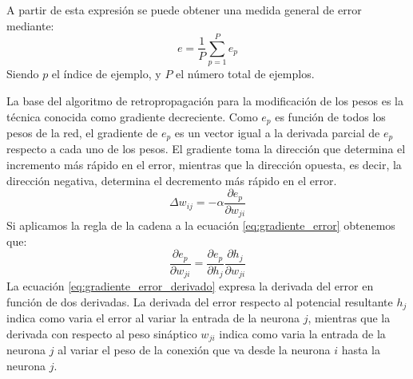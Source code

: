 \documentclass[12pt,letterpaper,oneside,openright]{book}
\begin{document}
 	A partir de esta expresión se puede obtener una medida general de error mediante: 
 	\begin{equation}
 		\label{eq:error_general}
 		e = \frac{1}{P} \sum_{p=1}^{P}e_p
 	\end{equation}
 	Siendo $p$ el índice de ejemplo, y $P$ el número total de ejemplos.
 	
 	La base del algoritmo de retropropagación para la modificación de los pesos es la técnica conocida como gradiente decreciente.
 	Como $e_p$ es función de todos los pesos de la red, el gradiente de $e_p$ es un vector igual a la derivada parcial de $e_p$ respecto a cada uno de los pesos. El gradiente toma la dirección que determina el incremento más rápido en el error, mientras que la dirección opuesta, es decir, la dirección negativa, determina el decremento más rápido en el error.
 	\begin{equation}
 		\label{eq:gradiente_error}
 		\Delta w_{ij} = -\alpha\frac{\partial e_p}{\partial w_{ji}}
 	\end{equation}
 	Si aplicamos la regla de la cadena a la ecuación \ref{eq:gradiente_error} obtenemos que:
 	\begin{equation}
 		\label{eq:gradiente_error_derivado}
 		\frac{\partial e_p}{\partial w_{ji}} = \frac{\partial e_p}{\partial h_j}\frac{\partial h_j}{\partial w_{ji}}
 	\end{equation}
 	La ecuación \ref{eq:gradiente_error_derivado} expresa la derivada del error en función de dos derivadas. La derivada del error respecto al potencial resultante $h_j$ indica como varia el error al variar la entrada de la neurona $j$, mientras que la derivada con respecto al peso sináptico $w_{ji}$ indica como varia la entrada de la neurona $j$ al variar el peso de la conexión que va desde la neurona $i$ hasta la neurona $j$.
 	
\end{document}
